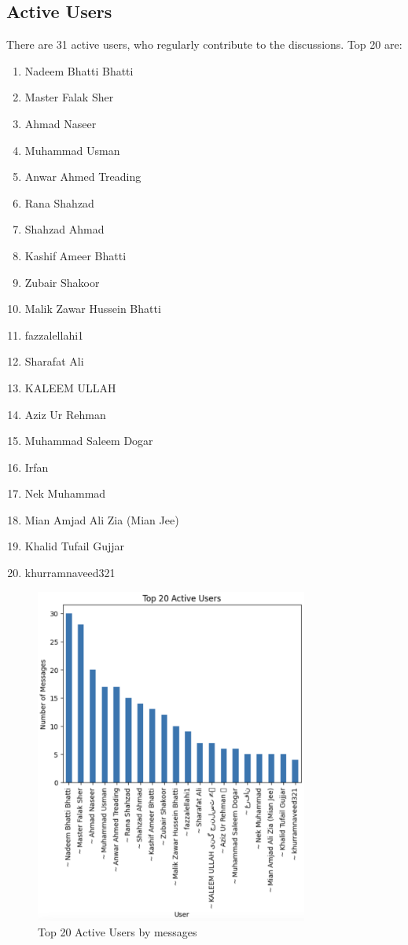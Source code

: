 \documentclass[12pt]{article}
\begin{document}
\subsection{Active Users}
There are 31 active users, who regularly contribute to the discussions. Top 20 are:
\begin{enumerate}
  \item Nadeem Bhatti Bhatti
  \item Master Falak Sher
  \item Ahmad Naseer
  \item Muhammad Usman
  \item Anwar Ahmed Treading
  \item Rana Shahzad
  \item Shahzad Ahmad
  \item Kashif Ameer Bhatti
  \item Zubair Shakoor
  \item Malik Zawar Hussein Bhatti
  \item fazzalellahi1
  \item Sharafat Ali
  \item KALEEM ULLAH
  \item Aziz Ur Rehman
  \item Muhammad Saleem Dogar
  \item Irfan
  \item Nek Muhammad
  \item Mian Amjad Ali Zia (Mian Jee)
  \item Khalid Tufail Gujjar
  \item khurramnaveed321
\end{enumerate}
\begin{figure}[H]
  \centering
  \includegraphics[width=0.8\textwidth]{img/active_users.png}
  \caption{Top 20 Active Users by messages}
\end{figure}
\end{document}
